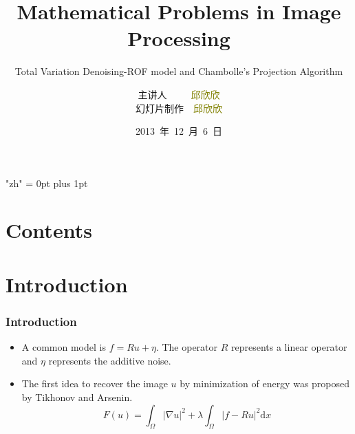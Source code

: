 \documentclass[notheorems,mathserif,table,compress]{beamer}  %
\begin{document}
\XeTeXlinebreaklocale "zh"         %
\XeTeXlinebreakskip = 0pt plus 1pt %


\title[Mathematical Problems]{Mathematical Problems in Image Processing}
\subtitle{Total Variation Denoising-ROF model and Chambolle's Projection Algorithm}
\author[qiu]{主讲人~~~~~\textcolor{olive}{邱欣欣}\\
    \quad 幻灯片制作~~\textcolor{olive}{邱欣欣}}
\institute[中国海洋大学]{\small\textcolor{violet}{中国海洋大学~~信息科学与工程学院}}
\date{2013~年~12~月~6~日}
\frame{ \titlepage }
\section*{Contents}
\section{Introduction}

%
\begin{frame}
\frametitle{Introduction}
\begin{itemize}
\item A common model is $f=Ru+\eta$. The operator $R$ represents a linear operator and $\eta$ represents the additive noise. 
\item The first idea to recover the image $u$ by minimization of energy was proposed by Tikhonov and Arsenin. 
\newcommand{\ud}{\mathrm{d}}
\begin{displaymath}
F(u)=\int_{\Omega}|\nabla u|^2+\lambda \int_{\Omega}|f-Ru|^2\ud x
\end{displaymath}

\end{itemize}
\end{frame}
\end{document}
